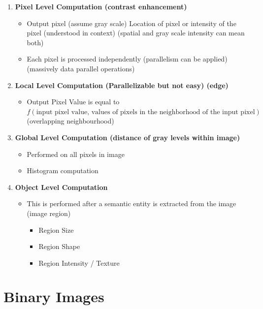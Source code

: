 \documentclass[11pt]{article}
\theoremstyle{definition}
\begin{document}
\begin{enumerate}
\item \textbf{Pixel Level Computation (contrast enhancement)}
  \begin{itemize}
    \item Output pixel (assume gray scale) Location of pixel or intensity of the pixel (understood in context)
          (spatial and gray scale intensity can mean both)
    \item Each pixel is processed independently
          (parallelism can be applied)
          (massively data parallel operations)
  \end{itemize}

\item \textbf{Local Level Computation (Parallelizable but not easy) (edge)}
  \begin{itemize}
    \item Output Pixel Value is equal to\\
    $f(\text{input pixel value, }\allowbreak
    \text{values of pixels in the neighborhood of the input pixel})$
    (overlapping neighbourhood)
  \end{itemize}

\item \textbf{Global Level Computation (distance of gray levels within image)}
  \begin{itemize}
    \item Performed on all pixels in image
    \item Histogram computation
  \end{itemize}

\item \textbf{Object Level Computation}
  \begin{itemize}
    \item This is performed after a semantic entity is extracted from the image (image region)
    \begin{itemize}
      \item Region Size
      \item Region Shape
      \item Region Intensity / Texture
    \end{itemize}
  \end{itemize}
\end{enumerate}

\newpage
\section{Binary Images}
\end{document}
